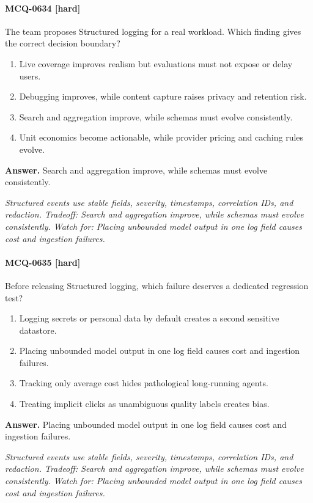 \paragraph{MCQ-0634 [hard]} The team proposes Structured logging for a real workload. Which finding gives the correct decision boundary?
\begin{enumerate}[label=\Alph*.]
\item Live coverage improves realism but evaluations must not expose or delay users.
\item Debugging improves, while content capture raises privacy and retention risk.
\item Search and aggregation improve, while schemas must evolve consistently.
\item Unit economics become actionable, while provider pricing and caching rules evolve.
\end{enumerate}
\noindent\textbf{Answer.} Search and aggregation improve, while schemas must evolve consistently.
\par\textit{Structured events use stable fields, severity, timestamps, correlation IDs, and redaction. Tradeoff: Search and aggregation improve, while schemas must evolve consistently. Watch for: Placing unbounded model output in one log field causes cost and ingestion failures.}
\paragraph{MCQ-0635 [hard]} Before releasing Structured logging, which failure deserves a dedicated regression test?
\begin{enumerate}[label=\Alph*.]
\item Logging secrets or personal data by default creates a second sensitive datastore.
\item Placing unbounded model output in one log field causes cost and ingestion failures.
\item Tracking only average cost hides pathological long-running agents.
\item Treating implicit clicks as unambiguous quality labels creates bias.
\end{enumerate}
\noindent\textbf{Answer.} Placing unbounded model output in one log field causes cost and ingestion failures.
\par\textit{Structured events use stable fields, severity, timestamps, correlation IDs, and redaction. Tradeoff: Search and aggregation improve, while schemas must evolve consistently. Watch for: Placing unbounded model output in one log field causes cost and ingestion failures.}
